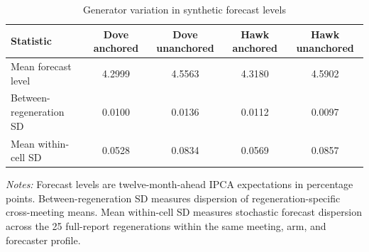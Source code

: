 \begin{table}[htbp]
\color{revisionred}
\centering
\begin{threeparttable}
\caption{Generator variation in synthetic forecast levels}
\label{tab:crossdraw-levels}
\begin{scriptsize}
\setlength{\tabcolsep}{3.2pt}
\begin{tabular}{lcccc}
\toprule
Statistic & Dove anchored & Dove unanchored & Hawk anchored & Hawk unanchored \\
\midrule
Mean forecast level & 4.2999 & 4.5563 & 4.3180 & 4.5902 \\
Between-regeneration SD & 0.0100 & 0.0136 & 0.0112 & 0.0097 \\
Mean within-cell SD & 0.0528 & 0.0834 & 0.0569 & 0.0857 \\
\bottomrule
\end{tabular}
\begin{tablenotes}[flushleft]
\scriptsize
\item \textit{Notes:} Forecast levels are twelve-month-ahead IPCA expectations in percentage points. Between-regeneration SD measures dispersion of regeneration-specific cross-meeting means. Mean within-cell SD measures stochastic forecast dispersion across the 25 full-report regenerations within the same meeting, arm, and forecaster profile.
\end{tablenotes}
\end{scriptsize}
\end{threeparttable}
\end{table}
